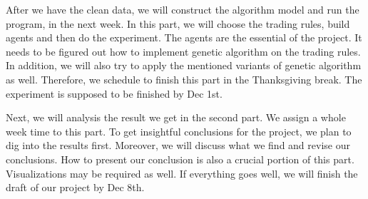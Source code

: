 \documentclass{article}
\begin{document}
After we have the clean data, we will construct the algorithm model and run the program, in the next week.
In this part, we will choose the trading rules, build agents and then do the experiment.
The agents are the essential of the project.
It needs to be figured out how to implement genetic algorithm on the trading rules.
In addition, we will also try to apply the mentioned variants of genetic algorithm as well.
Therefore, we schedule to finish this part in the Thanksgiving break.
The experiment is supposed to be finished by Dec 1st.

Next, we will analysis the result we get in the second part.
We assign a whole week time to this part.
To get insightful conclusions for the project, we plan to dig into the results first.
Moreover, we will discuss what we find and revise our conclusions.
How to present our conclusion is also a crucial portion of this part.
Visualizations may be required as well.
If everything goes well, we will finish the draft of our project by Dec 8th.





\end{document}
